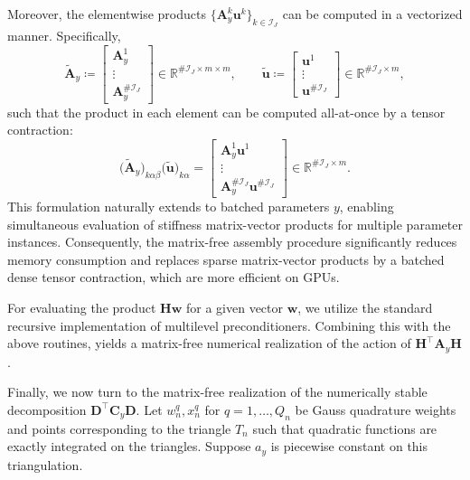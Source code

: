 \documentclass[a4paper,11pt]{amsart}
\numberwithin{equation}{section}
\theoremstyle{definition}
\theoremstyle{remark}
\theoremstyle{plain}
\begin{document}
Moreover, the elementwise products $\{\mathbf{A}_{y}^{k}\mathbf{u}^{k}\}_{k\in\mathcal{I}_{J}}$ can be computed in a vectorized manner. 
Specifically, 
\[
\widetilde{\mathbf{A}}_{y}
\coloneq 
\begin{bmatrix}
\mathbf{A}_{y}^{1} \\
\vdots \\
\mathbf{A}_{y}^{\#\mathcal{I}_{J}}
\end{bmatrix}\in\mathbb{R}^{\#\mathcal{I}_{J}\times m\times m},
\qquad
\widetilde{\mathbf{u}}
\coloneq
\begin{bmatrix}
\mathbf{u}^{1} \\ \vdots \\ \mathbf{u}^{\#\mathcal{I}_{J}}
\end{bmatrix}\in\mathbb{R}^{\#\mathcal{I}_{J}\times m},
\]
such that the product in each element can be computed all-at-once by a tensor contraction:
\[
\bigl(\widetilde{\mathbf{A}}_{y}\bigr)_{k\alpha\beta}\bigl(\widetilde{\mathbf{u}}\bigr)_{k\alpha}
=
\begin{bmatrix}
\mathbf{A}_{y}^{1}\mathbf{u}^{1} \\ \vdots \\ \mathbf{A}_{y}^{\#\mathcal{I}_{J}}\mathbf{u}^{\#\mathcal{I}_{J}}
\end{bmatrix}\in\mathbb{R}^{\#\mathcal{I}_{J}\times m}.
\]
This formulation naturally extends to batched parameters $y$, enabling simultaneous evaluation of stiffness matrix-vector products for multiple parameter instances.
Consequently, the matrix-free assembly procedure significantly reduces memory consumption and replaces sparse matrix-vector products by a batched dense tensor contraction, which are more efficient on GPUs.

For evaluating the product $\mathbf{H}\mathbf{w}$ for a given vector $\mathbf{w}$, we utilize the standard recursive implementation of multilevel preconditioners.
Combining this with the above routines, yields a matrix-free numerical realization of the action of $\mathbf H^\intercal \mathbf A_y \mathbf H$.

Finally, we now turn to the matrix-free realization of the numerically stable decomposition $\mathbf D^\intercal \mathbf C_y \mathbf D$.
Let $w_{n}^{q},x_{n}^{q}$ for $q=1,\dots, Q_n$ be Gauss quadrature weights and points corresponding to the triangle $T_{n}$ such that quadratic functions are exactly integrated on the triangles. Suppose $a_y$ is piecewise constant on this triangulation.
\end{document}
